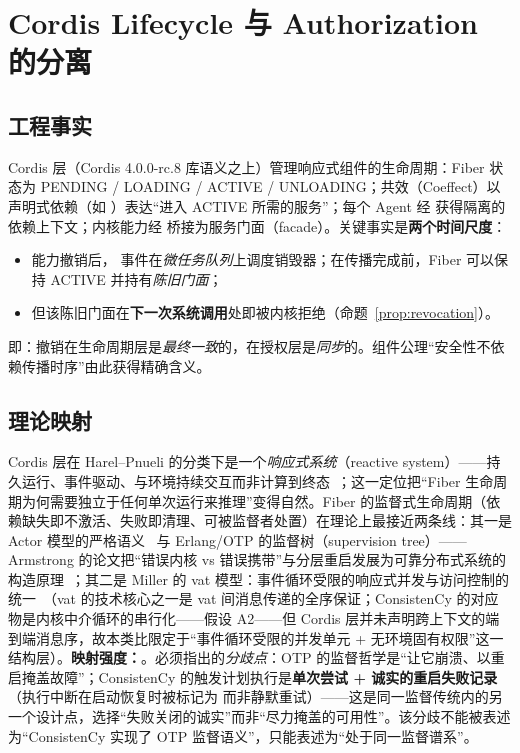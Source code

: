 \chapter{Cordis Lifecycle 与 Authorization 的分离}\label{ch:sep}

\section{工程事实}

Cordis 层（Cordis 4.0.0-rc.8 库语义之上）管理响应式组件的生命周期：Fiber 状态为 PENDING / LOADING / ACTIVE / UNLOADING；共效（Coeffect）以声明式依赖（如 ）表达“进入 ACTIVE 所需的服务”；每个 Agent 经  获得隔离的依赖上下文；内核能力经  桥接为服务门面（facade）。关键事实是\textbf{两个时间尺度}：
\begin{itemize}[itemsep=0.05em]
  \item 能力撤销后， 事件在\emph{微任务队列}上调度销毁器；在传播完成前，Fiber 可以保持 ACTIVE 并持有\emph{陈旧门面}；
  \item 但该陈旧门面在\textbf{下一次系统调用}处即被内核拒绝（命题~\ref{prop:revocation}）。
\end{itemize}
即：撤销在生命周期层是\emph{最终一致}的，在授权层是\emph{同步}的。组件公理“安全性不依赖传播时序”由此获得精确含义。

\section{理论映射}

Cordis 层在 Harel--Pnueli 的分类下是一个\emph{响应式系统}（reactive system）——持久运行、事件驱动、与环境持续交互而非计算到终态~\cite{harel1985}；这一定位把“Fiber 生命周期为何需要独立于任何单次运行来推理”变得自然。Fiber 的监督式生命周期（依赖缺失即不激活、失败即清理、可被监督者处置）在理论上最接近两条线：其一是 Actor 模型的严格语义~\cite{agha1986} 与 Erlang/OTP 的监督树（supervision tree）——Armstrong 的论文把“错误内核 vs 错误携带”与分层重启发展为可靠分布式系统的构造原理~\cite{armstrong2003}；其二是 Miller 的 vat 模型：事件循环受限的响应式并发与访问控制的统一~\cite{miller2006}（vat 的技术核心之一是 vat 间消息传递的全序保证；ConsistenCy 的对应物是内核中介循环的串行化——假设 A2——但 Cordis 层并未声明跨上下文的端到端消息序，故本类比限定于“事件循环受限的并发单元 + 无环境固有权限”这一结构层）。\textbf{映射强度：\STRONG}。必须指出的\emph{分歧点}：OTP 的监督哲学是“让它崩溃、以重启掩盖故障”；ConsistenCy 的触发计划执行是\textbf{单次尝试 + 诚实的重启失败记录}（执行中断在启动恢复时被标记为  而非静默重试）——这是同一监督传统内的另一个设计点，选择“失败关闭的诚实”而非“尽力掩盖的可用性”。该分歧不能被表述为“ConsistenCy 实现了 OTP 监督语义”，只能表述为“处于同一监督谱系”。

